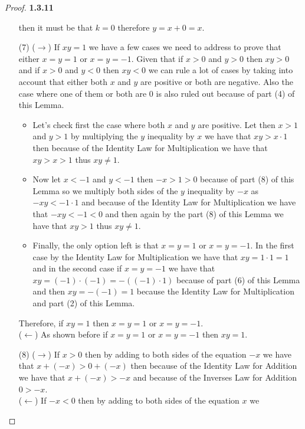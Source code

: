 \documentclass[11pt]{article}
\theoremstyle{definition}
\begin{document}
\begin{proof}{\textbf{1.3.11}}
\begin{itemize}
        then it must be that $k = 0$ therefore $y = x + 0 = x$.
        \item [(7)]
        ($\rightarrow$) If $xy=1$ we have a few cases we need to address to prove that
        either $x=y=1$ or $x=y=-1$. Given that if $x >0$ and $y >0$ then $xy > 0$ and
        if $x>0$ and $y<0$ then $xy < 0$ we can rule a lot of cases by taking into
        account that either both $x$ and $y$ are positive or both are negative. Also
        the case where one of them or both are $0$ is also ruled out because of part (4)
        of this Lemma.
        \begin{itemize}
            \item Let's check first the case where both $x$ and $y$ are positive.
            Let then $x > 1$ and $y > 1$ by multiplying the $y$ inequality by $x$
            we have that $xy>x\cdot 1$ then because of the Identity Law for
            Multiplication we have that $xy > x > 1$ thus $xy \neq 1$.
            \item Now let $x<-1$ and $y<-1$ then $-x > 1 > 0$ because of part (8) of this
            Lemma so we multiply both sides of the $y$ inequality by $-x$ as
            $-xy < -1 \cdot 1$ and because of the Identity Law for Multiplication we
            have that $-xy < -1 < 0$ and then again by the part (8) of this Lemma we have
            that $xy > 1$ thus $xy \neq 1$.
            \item Finally, the only option left is that $x=y=1$ or $x=y=-1$. In the first
            case by the Identity Law for Multiplication we have that
            $xy = 1 \cdot 1 = 1$ and in the second case if $x=y=-1$ we have that
            $xy= (-1) \cdot (-1) = -((-1)\cdot 1)$ because of part (6) of this Lemma and
            then $xy = -(-1) = 1$ because the Identity Law for Multiplication and part
            (2) of this Lemma.            
        \end{itemize}
        Therefore, if $xy=1$ then $x=y=1$ or $x=y=-1$.\\ 
        ($\leftarrow$) As shown before if $x=y=1$ or $x=y=-1$ then $xy=1$.
        \item [(8)]
        ($\rightarrow$) If $x > 0$ then by adding to both sides of the equation $-x$ we
        have that $x+ (-x) > 0 + (-x)$ then because of the Identity Law for Addition we
        have that $x+ (-x) > -x$ and because of the Inverses Law for Addition $0 > -x$.\\
        ($\leftarrow$) If $-x < 0$ then by adding to both sides of the equation $x$ we

\end{itemize}
\end{proof}
\end{document}
